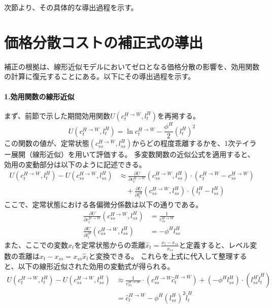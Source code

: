 次節より、その具体的な導出過程を示す。

\section{価格分散コストの補正式の導出}
\label{sec:appendix_welfare_correction_derivation}

補正の根拠は、線形近似モデルにおいてゼロとなる価格分散の影響を、効用関数の計算に復元することにある。以下にその導出過程を示す。

\paragraph{1.効用関数の線形近似}\label{sec:appendix_welfare_correction_derivation_p1}

まず、前節で示した期間効用関数\(U(c_t^{H\to W},l_t^H)\)を再掲する。
\begin{equation}
    U(c_t^{H\to W},l_t^H)=\ln c_t^{H\to W}-\frac{\phi^H}{2}(l_t^H)^2
\label{eq:appendix_welfare_correction_derivation_utility_restated}
\end{equation}
この関数の値が、定常状態\((c_{ss}^{H\to W},l_{ss}^H)\)からどの程度乖離するかを、1次テイラー展開（線形近似）を用いて評価する。
多変数関数の近似公式を適用すると、効用の変動部分は以下のように記述できる。
\begin{align}
    U(c_t^{H\to W},l_t^H)-U(c_{ss}^{H\to W},l_{ss}^H)&\approx\frac{\partial U}{\partial c_t^{H\to W}}(c_{ss}^{H\to W},l_{ss}^H)\cdot(c_t^{H\to W}-c_{ss}^{H\to W}) \label{eq:appendix_welfare_correction_derivation_utility_taylor_step1} \\
    &\quad+\frac{\partial U}{\partial l_t^H}(c_{ss}^{H\to W},l_{ss}^H)\cdot(l_t^H-l_{ss}^H)
\label{eq:appendix_welfare_correction_derivation_utility_taylor}
\end{align}
ここで、定常状態における各偏微分係数は以下の通りである。
\begin{align}
    \frac{\partial U}{\partial c_t^{H\to W}}(c_{ss}^{H\to W},l_{ss}^H)&=\frac{1}{c_{ss}^{H\to W}} \label{eq:appendix_welfare_correction_derivation_diff_c} \\
    \frac{\partial U}{\partial l_t^H}(c_{ss}^{H\to W},l_{ss}^H)&=-\phi^Hl_{ss}^H \label{eq:appendix_welfare_correction_derivation_diff_l}
\end{align}
また、ここでの変数\(\hat{x}_t\)を定常状態からの乖離\(\hat{x}_t=\frac{x_t-x_{ss}}{x_{ss}}\)と定義すると、レベル変数の乖離は\(x_t-x_{ss}=x_{ss}\hat{x}_t\)と変換できる。
これらを上式に代入して整理すると、以下の線形近似された効用の変動式が得られる。
\begin{align}
    U(c_t^{H\to W},l_t^H)-U(c_{ss}^{H\to W},l_{ss}^H)&\approx\frac{1}{c_{ss}^{H\to W}}\cdot(c_{ss}^{H\to W}\hat{c}_t^{H\to W})+(-\phi^Hl_{ss}^H)\cdot(l_{ss}^H\hat{l}_t^H) \label{eq:appendix_welfare_correction_derivation_utility_base_step} \\
    &=\hat{c}_t^{H\to W}-\phi^H(l_{ss}^H)^2\hat{l}_t^H
\label{eq:appendix_welfare_correction_derivation_utility_base}
\end{align}

